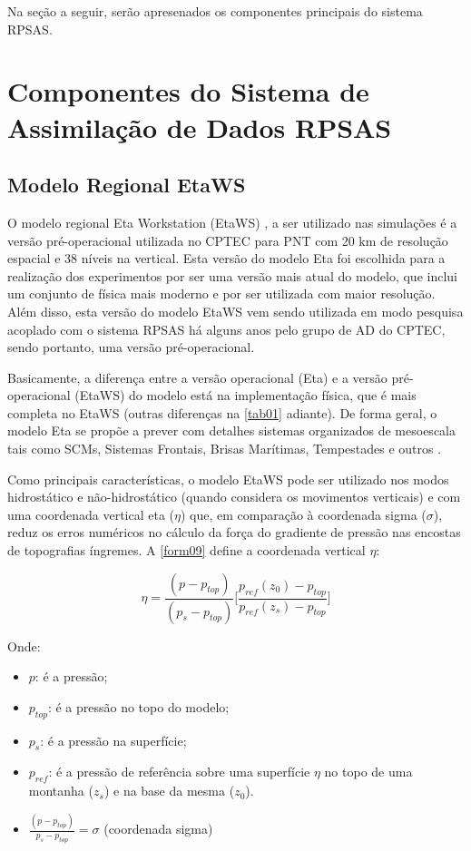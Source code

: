 Na seção a seguir, serão apresenados os componentes principais do sistema RPSAS.

\section{Componentes do Sistema de Assimilação de Dados RPSAS}
\label{ss:compsisassimdados}

\subsection{Modelo Regional EtaWS}

O modelo regional Eta Workstation (EtaWS) \cite{mesingeretal88}, \cite{black94} a ser utilizado nas \-si\-mu\-la\-ções é a versão pré-operacional utilizada no CPTEC para PNT com 20 km de resolução espacial e 38 níveis na vertical. Esta versão do modelo Eta foi escolhida para a realização dos experimentos por ser uma versão mais atual do modelo, que inclui um conjunto de física mais moderno e por ser utilizada com maior resolução. Além disso, esta versão do modelo EtaWS vem sendo utilizada em modo pesquisa acoplado com o sistema RPSAS há alguns anos pelo grupo de AD do CPTEC, sendo portanto, uma versão pré-operacional.

Basicamente, a diferença entre a versão operacional (Eta) e a versão pré-operacional (EtaWS) do modelo está na implementação física, que é mais completa no EtaWS (outras diferenças na \autoref{tab01} adiante). De forma geral, o modelo Eta se propõe a prever com detalhes sistemas organizados de mesoescala tais como SCMs, Sistemas Frontais, Brisas Marítimas, Tempestades e outros \cite{chou96}.

Como principais características, o modelo EtaWS pode ser utilizado nos modos hidrostático e não-hidrostático (quando considera os movimentos verticais) e com uma coordenada vertical eta ($\eta$) que, em comparação à coordenada sigma ($\sigma$), reduz os erros numéricos no cálculo da força do gradiente de pressão nas encostas de topografias íngremes. A \autoref{form09} define a coordenada vertical $\eta$:

\begin{equation}
\eta=\frac{(p-p_{top})}{(p_{s}-p_{top})}\bigg[\frac{p_{ref}(z_{0})-p_{top}}{p_{ref}(z_{s})-p_{top}}\bigg]
\label{form09}
\end{equation}

Onde:

\begin{itemize}
\item $p$: é a pressão;
\item $p_{top}$: é a pressão no topo do modelo;
\item $p_{s}$: é a pressão na superfície;
\item $p_{ref}$: é a pressão de referência sobre uma superfície $\eta$ no topo de uma montanha ($z_{s}$) e na base da mesma ($z_{0}$).
\item $\frac{(p-p_{top})}{p_{s}-p_{top}}=\sigma$ (coordenada sigma)
\end{itemize}

